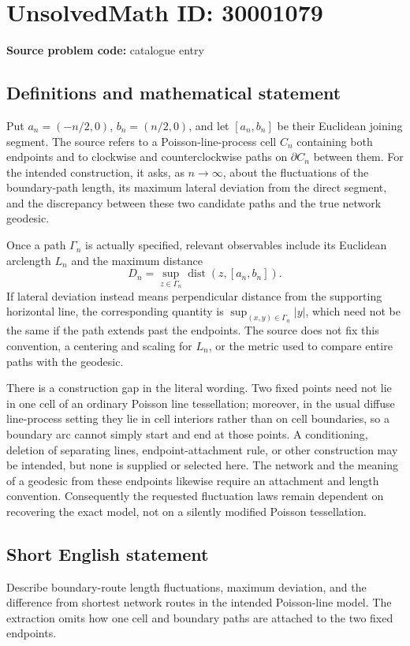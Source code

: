 \documentclass[11pt]{article}
\begin{document}
\section*{UnsolvedMath ID: 30001079}
\textbf{Source problem code:} catalogue entry
\subsection{Definitions and mathematical statement}
Put \(a_n=(-n/2,0)\), \(b_n=(n/2,0)\), and let \([a_n,b_n]\) be their Euclidean joining segment. The source refers to a Poisson-line-process cell \(C_n\) containing both endpoints and to clockwise and counterclockwise paths on \(\partial C_n\) between them. For the intended construction, it asks, as \(n\to\infty\), about the fluctuations of the boundary-path length, its maximum lateral deviation from the direct segment, and the discrepancy between these two candidate paths and the true network geodesic.

Once a path \(\Gamma_n\) is actually specified, relevant observables include its Euclidean arclength \(L_n\) and the maximum distance
\[
D_n=\sup_{z\in\Gamma_n}\operatorname{dist}(z,[a_n,b_n]).
\]
If lateral deviation instead means perpendicular distance from the supporting horizontal line, the corresponding quantity is \(\sup_{(x,y)\in\Gamma_n}|y|\), which need not be the same if the path extends past the endpoints. The source does not fix this convention, a centering and scaling for \(L_n\), or the metric used to compare entire paths with the geodesic.

There is a construction gap in the literal wording. Two fixed points need not lie in one cell of an ordinary Poisson line tessellation; moreover, in the usual diffuse line-process setting they lie in cell interiors rather than on cell boundaries, so a boundary arc cannot simply start and end at those points. A conditioning, deletion of separating lines, endpoint-attachment rule, or other construction may be intended, but none is supplied or selected here. The network and the meaning of a geodesic from these endpoints likewise require an attachment and length convention. Consequently the requested fluctuation laws remain dependent on recovering the exact model, not on a silently modified Poisson tessellation.
\subsection{Short English statement}
Describe boundary-route length fluctuations, maximum deviation, and the difference from shortest network routes in the intended Poisson-line model. The extraction omits how one cell and boundary paths are attached to the two fixed endpoints.
\end{document}
